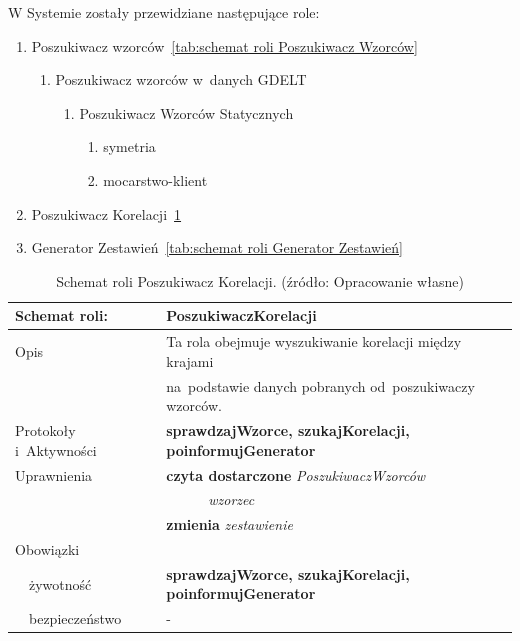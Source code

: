 \documentclass[11pt]{report}
\begin{document}
    W Systemie zostały przewidziane następujące role:

    \begin{enumerate}
        \item Poszukiwacz wzorców~\ref{tab:schemat roli Poszukiwacz Wzorców}
        \begin{enumerate}
            \item Poszukiwacz wzorców w~danych GDELT
            \begin{enumerate}
                \item Poszukiwacz Wzorców Statycznych
                \begin{enumerate}
                    \item symetria
                    \item mocarstwo-klient
                \end{enumerate}
            \end{enumerate}
        \end{enumerate}
        \item Poszukiwacz Korelacji~\ref{tab:schemat roli poszukiwacz korelacji}
        \item Generator Zestawień~\ref{tab:schemat roli Generator Zestawień}
    \end{enumerate}

    \begin{table}[ht!]
        \begin{tabular}{ll}
            Schemat roli:          & PoszukiwaczKorelacji                                           \\ \hline
            Opis                   & Ta rola obejmuje wyszukiwanie korelacji między krajami         \\
            & na~podstawie danych pobranych od~poszukiwaczy wzorców.         \\
            Protokoły i~Aktywności & \textbf{sprawdzajWzorce, szukajKorelacji, poinformujGenerator} \\
            Uprawnienia            & \textbf{czyta dostarczone} \textit{PoszukiwaczWzorców}         \\
            & ~~~~~~\textit{wzorzec}                                         \\
            & \textbf{zmienia} \textit{zestawienie}                          \\
            Obowiązki              &                                                                \\
            ~~żywotność            & \textbf{sprawdzajWzorce, szukajKorelacji, poinformujGenerator} \\
            ~~bezpieczeństwo       & -                                                              \\
        \end{tabular}
        \caption{Schemat roli Poszukiwacz Korelacji. (źródło: Opracowanie własne)}
        \label{tab:schemat roli poszukiwacz korelacji}
    \end{table}
\end{document}
